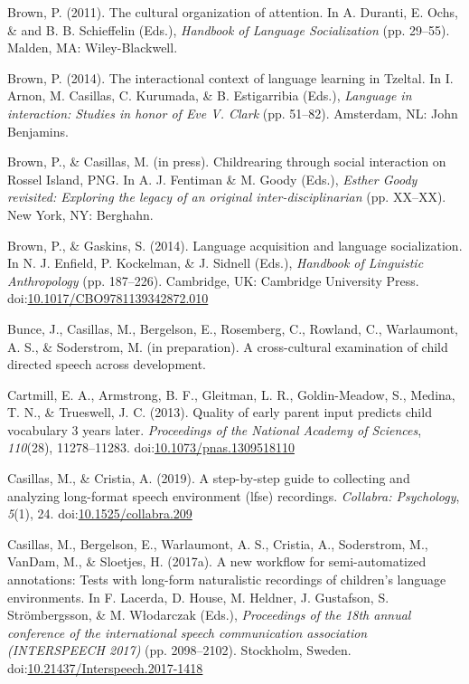 \documentclass[,man,mask,floatsintext]{apa6}
\begin{document}
\hypertarget{ref-brown2011cultural}{}
Brown, P. (2011). The cultural organization of attention. In A. Duranti,
E. Ochs, \& and B. B. Schieffelin (Eds.), \emph{Handbook of Language
Socialization} (pp. 29--55). Malden, MA: Wiley-Blackwell.

\hypertarget{ref-brown2014interactional}{}
Brown, P. (2014). The interactional context of language learning in
Tzeltal. In I. Arnon, M. Casillas, C. Kurumada, \& B. Estigarribia
(Eds.), \emph{Language in interaction: Studies in honor of Eve V. Clark}
(pp. 51--82). Amsterdam, NL: John Benjamins.

\hypertarget{ref-brownIPchildrearing}{}
Brown, P., \& Casillas, M. (in press). Childrearing through social
interaction on Rossel Island, PNG. In A. J. Fentiman \& M. Goody (Eds.),
\emph{Esther Goody revisited: Exploring the legacy of an original
inter-disciplinarian} (pp. XX--XX). New York, NY: Berghahn.

\hypertarget{ref-brown2014language}{}
Brown, P., \& Gaskins, S. (2014). Language acquisition and language
socialization. In N. J. Enfield, P. Kockelman, \& J. Sidnell (Eds.),
\emph{Handbook of Linguistic Anthropology} (pp. 187--226). Cambridge,
UK: Cambridge University Press.
doi:\href{https://doi.org/10.1017/CBO9781139342872.010}{10.1017/CBO9781139342872.010}

\hypertarget{ref-bunceIPCDS}{}
Bunce, J., Casillas, M., Bergelson, E., Rosemberg, C., Rowland, C.,
Warlaumont, A. S., \& Soderstrom, M. (in preparation). A cross-cultural
examination of child directed speech across development.

\hypertarget{ref-cartmill2013quality}{}
Cartmill, E. A., Armstrong, B. F., Gleitman, L. R., Goldin-Meadow, S.,
Medina, T. N., \& Trueswell, J. C. (2013). Quality of early parent input
predicts child vocabulary 3 years later. \emph{Proceedings of the
National Academy of Sciences}, \emph{110}(28), 11278--11283.
doi:\href{https://doi.org/10.1073/pnas.1309518110}{10.1073/pnas.1309518110}

\hypertarget{ref-casillas2019stepbystep}{}
Casillas, M., \& Cristia, A. (2019). A step-by-step guide to collecting
and analyzing long-format speech environment (lfse) recordings.
\emph{Collabra: Psychology}, \emph{5}(1), 24.
doi:\href{https://doi.org/10.1525/collabra.209}{10.1525/collabra.209}

\hypertarget{ref-casillas2017workflow}{}
Casillas, M., Bergelson, E., Warlaumont, A. S., Cristia, A., Soderstrom,
M., VanDam, M., \& Sloetjes, H. (2017a). A new workflow for
semi-automatized annotations: Tests with long-form naturalistic
recordings of children's language environments. In F. Lacerda, D. House,
M. Heldner, J. Gustafson, S. Strömbergsson, \& M. Włodarczak (Eds.),
\emph{Proceedings of the 18th annual conference of the international
speech communication association (INTERSPEECH 2017)} (pp. 2098--2102).
Stockholm, Sweden.
doi:\href{https://doi.org/10.21437/Interspeech.2017-1418}{10.21437/Interspeech.2017-1418}
\end{document}
